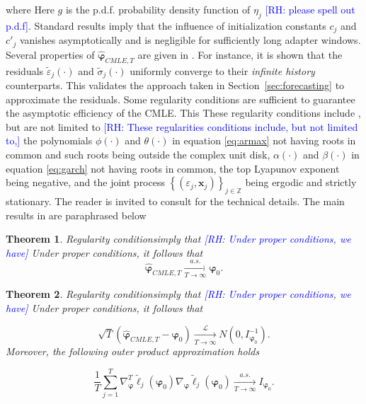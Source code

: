 \documentclass[10pt,a4paper,oneside]{article}
\newcommand{\Z}{\mathbb{Z}}
\newcommand{\rh}[1]{\textcolor{blue}{\textsf{[RH: #1]}}}
\newtheorem{theorem}{Theorem}
\providecommand{\DIFaddtex}[1]{{\protect\color{blue} \sf #1}} %
\providecommand{\DIFdeltex}[1]{{\protect\color{red} \scriptsize #1}} %
\providecommand{\DIFaddbegin}{} %
\providecommand{\DIFaddend}{} %
\providecommand{\DIFdelbegin}{} %
\providecommand{\DIFdelend}{} %
\providecommand{\DIFadd}[1]{\texorpdfstring{\DIFaddtex{#1}}{#1}} %
\providecommand{\DIFdel}[1]{\texorpdfstring{\DIFdeltex{#1}}{}} %
\newcommand{\DIFscaledelfig}{0.5}
\newlength{\DIFdelgraphicswidth} %
\newlength{\DIFdelgraphicsheight} %
\newcommand{\DIFaddincludegraphics}[2][]{{\color{blue}\fbox{\DIFOincludegraphics[#1]{#2}}}} %
\newcommand{\DIFdelincludegraphics}[2][]{%
\sbox{\DIFdelgraphicsbox}{\DIFOincludegraphics[#1]{#2}}%
\settoboxwidth{\DIFdelgraphicswidth}{\DIFdelgraphicsbox} %
\settoboxtotalheight{\DIFdelgraphicsheight}{\DIFdelgraphicsbox} %
\scalebox{\DIFscaledelfig}{%
\parbox[b]{\DIFdelgraphicswidth}{\usebox{\DIFdelgraphicsbox}\\[-\baselineskip] \rule{\DIFdelgraphicswidth}{0em}}\llap{\resizebox{\DIFdelgraphicswidth}{\DIFdelgraphicsheight}{%
\setlength{\unitlength}{\DIFdelgraphicswidth}%
\begin{picture}(1,1)%
\thicklines\linethickness{2pt} %
{\color[rgb]{1,0,0}\put(0,0){\framebox(1,1){}}}%
{\color[rgb]{1,0,0}\put(0,0){\line( 1,1){1}}}%
{\color[rgb]{1,0,0}\put(0,1){\line(1,-1){1}}}%
\end{picture}%
}\hspace*{3pt}}} %
} %
\DeclareRobustCommand{\DIFaddbegin}{\DIFOaddbegin \let\includegraphics\DIFaddincludegraphics} %
\DeclareRobustCommand{\DIFaddend}{\DIFOaddend \let\includegraphics\DIFOincludegraphics} %
\DeclareRobustCommand{\DIFdelbegin}{\DIFOdelbegin \let\includegraphics\DIFdelincludegraphics} %
\DeclareRobustCommand{\DIFdelend}{\DIFOaddend \let\includegraphics\DIFOincludegraphics} %
\begin{document}
\DIFdelbegin \DIFdel{where }\DIFdelend \DIFaddbegin \DIFadd{Here }\DIFaddend $g$ is the \DIFdelbegin \DIFdel{p.d.f. }\DIFdelend \DIFaddbegin \DIFadd{probability density function }\DIFaddend of $\eta_j$\DIFdelbegin \DIFdel{\rh{please spell out p.d.f}}\DIFdelend . Standard results imply that the influence of initialization constants $c_j$ and $c'_j$ vanishes asymptotically and is negligible for sufficiently long adapter windows. Several properties of $\hat{\boldsymbol{\varphi}}_{CMLE, T}$ are given in \cite{mejia2025asymptotic}. For instance, it is shown that the residuals $\tilde{\varepsilon}_j(\cdot)$ and $\tilde{\sigma}_j(\cdot)$ uniformly converge to their \textit{infinite history} counterparts. This validates the approach taken in Section~\ref{sec:forecasting} to approximate the residuals. Some regularity conditions are sufficient to guarantee the asymptotic efficiency of the CMLE. \DIFdelbegin \DIFdel{This }\DIFdelend \DIFaddbegin \DIFadd{These }\DIFaddend regularity conditions include\DIFaddbegin \DIFadd{, }\DIFaddend but are not limited to \DIFdelbegin \DIFdel{\rh{These regularities conditions include, but not limited to,} }\DIFdelend the polynomials $\phi(\cdot)$ and $\theta(\cdot)$ in equation \eqref{eq:armax} not having roots in common and such roots being outside the complex unit disk, $\alpha(\cdot)$ and $\beta(\cdot)$ in equation \eqref{eq:garch} not having roots in common, the top Lyapunov exponent being negative, and the joint process $\left\{ \left( \varepsilon_j, \mathbf{x}_j \right)  \right\}_{j \in \Z}$ being ergodic and strictly stationary. The reader is invited to consult \cite{mejia2025asymptotic} for the technical details. The main results in \cite{mejia2025asymptotic} are paraphrased below

\begin{theorem}
    \DIFdelbegin \DIFdel{Regularity conditionsimply that
    \rh{Under proper conditions, we have}
    }\DIFdelend \DIFaddbegin \DIFadd{Under proper conditions, it follows that
    }\DIFaddend $$
        \hat{\boldsymbol{\varphi}}_{CMLE, T} \xrightarrow[T \rightarrow \infty]{a.s.} \boldsymbol{\varphi}_0.
    $$
    \label{thm:consistency}
\end{theorem}

\begin{theorem}
    \DIFdelbegin \DIFdel{Regularity conditionsimply that
\rh{Under proper conditions, we have}
}\DIFdelend \DIFaddbegin \DIFadd{Under proper conditions, it follows that
}\DIFaddend 

    $$
        \sqrt{T} (\hat{\boldsymbol{\varphi}}_{CMLE, T} - \boldsymbol{\varphi}_0) \xrightarrow[T \rightarrow \infty]{\mathcal{L}} N \left(0, I^{-1}_{\boldsymbol{\varphi}_0} \right).
    $$
    Moreover, the following outer product approximation holds

    $$
        \frac{1}{T} \sum^T_{j = 1} \nabla^T_{\boldsymbol{\varphi}} \tilde{\ell}_j(\boldsymbol{\varphi}_0) \nabla_{\boldsymbol{\varphi}} \tilde{\ell}_j(\boldsymbol{\varphi}_0) \xrightarrow[T \rightarrow \infty]{a.s.} I_{\boldsymbol{\varphi}_0}.
    $$
    \label{thm:asymptotic_normality}
\end{theorem}
\end{document}
